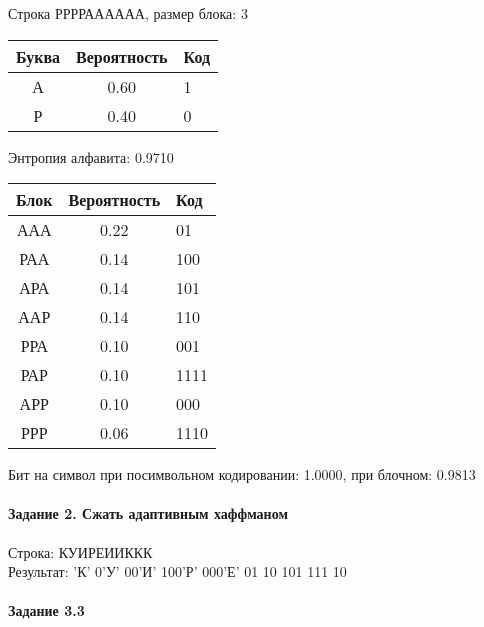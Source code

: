 \documentclass[a4paper, 12pt]{article}
\begin{document}
Строка РРРРАААААА, размер блока: 3
\begin{center}
 \begin{tabular}{ |c|c|l| } 
  \hline
     Буква & Вероятность & Код\\ \hline
А & 0.60 & 1\\\hline
Р & 0.40 & 0
\\ \hline \end{tabular}
\end{center}
Энтропия алфавита: 0.9710
\begin{center}
 \begin{tabular}{ |c|c|l| } 
  \hline
     Блок & Вероятность & Код\\ \hline
ААА & 0.22 & 01\\\hline
РАА & 0.14 & 100\\\hline
АРА & 0.14 & 101\\\hline
ААР & 0.14 & 110\\\hline
РРА & 0.10 & 001\\\hline
РАР & 0.10 & 1111\\\hline
АРР & 0.10 & 000\\\hline
РРР & 0.06 & 1110
\\ \hline \end{tabular}
\end{center}
Бит на символ при посимвольном кодировании: 1.0000, при блочном: 0.9813


\pagebreak
\paragraph{Задание 2. Сжать адаптивным хаффманом\\}

Строка: 
КУИРЕИИККК\\
Результат: 'К' 0'У' 00'И' 100'Р' 000'Е' 01 10 101 111 10










\pagebreak

\paragraph{Задание 3.3}
\end{document}
